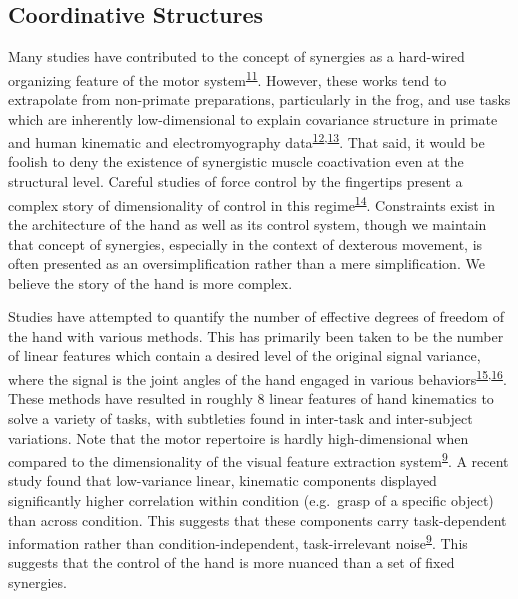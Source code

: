 \documentclass[
  a4paper,
]{article}
\begin{document}
\hypertarget{coordinative-structures}{%
\subsection{Coordinative Structures}\label{coordinative-structures}}

Many studies have contributed to the concept of synergies as a
hard-wired organizing feature of the motor
system\textsuperscript{\protect\hyperlink{ref-DAvella2003}{11}}.
However, these works tend to extrapolate from non-primate preparations,
particularly in the frog, and use tasks which are inherently
low-dimensional to explain covariance structure in primate and human
kinematic and electromyography
data\textsuperscript{\protect\hyperlink{ref-giszterMotorPrimitivesNew2015}{12},\protect\hyperlink{ref-gao2017}{13}}.
That said, it would be foolish to deny the existence of synergistic
muscle coactivation even at the structural level. Careful studies of
force control by the fingertips present a complex story of
dimensionality of control in this
regime\textsuperscript{\protect\hyperlink{ref-raczSpatiotemporalAnalysisReveals2013}{14}}.
Constraints exist in the architecture of the hand as well as its control
system, though we maintain that concept of synergies, especially in the
context of dexterous movement, is often presented as an
oversimplification rather than a mere simplification. We believe the
story of the hand is more complex.

Studies have attempted to quantify the number of effective degrees of
freedom of the hand with various methods. This has primarily been taken
to be the number of linear features which contain a desired level of the
original signal variance, where the signal is the joint angles of the
hand engaged in various
behaviors\textsuperscript{\protect\hyperlink{ref-Ingram2009}{15},\protect\hyperlink{ref-TodorovDimensionality2005}{16}}.
These methods have resulted in roughly 8 linear features of hand
kinematics to solve a variety of tasks, with subtleties found in
inter-task and inter-subject variations. Note that the motor repertoire
is hardly high-dimensional when compared to the dimensionality of the
visual feature extraction
system\textsuperscript{\protect\hyperlink{ref-yanUnexpectedComplexityEveryday2020}{9}}.
A recent study found that low-variance linear, kinematic components
displayed significantly higher correlation within condition (e.g.~grasp
of a specific object) than across condition. This suggests that these
components carry task-dependent information rather than
condition-independent, task-irrelevant
noise\textsuperscript{\protect\hyperlink{ref-yanUnexpectedComplexityEveryday2020}{9}}.
This suggests that the control of the hand is more nuanced than a set of
fixed synergies.
\end{document}
